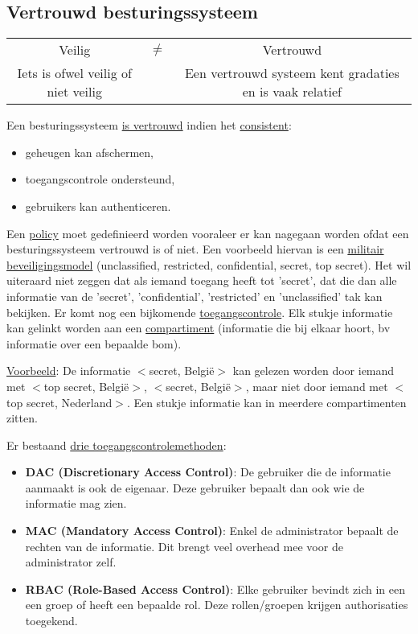 \documentclass{report}
\begin{document}
	\subsection{Vertrouwd besturingssysteem}

	\begin{table}[ht]
		\centering
		\begin{tabular}{c c c}
			Veilig & $\neq$  & Vertrouwd \\

			Iets is ofwel veilig of niet veilig & & Een vertrouwd systeem kent gradaties en is vaak relatief
		\end{tabular}
	\end{table}

	Een besturingssysteem \underline{is vertrouwd} indien het \underline{consistent}:
	\begin{itemize}
		\item geheugen kan afschermen,
		\item toegangscontrole ondersteund,
		\item gebruikers kan authenticeren.
	\end{itemize}

	Een \underline{policy} moet gedefinieerd worden vooraleer er kan nagegaan worden ofdat een besturingssysteem vertrouwd is of niet. Een voorbeeld hiervan is een \underline{militair beveiligingsmodel} (unclassified, restricted, confidential, secret, top secret). Het wil uiteraard niet zeggen dat als iemand toegang heeft tot 'secret', dat die dan alle informatie van de 'secret', 'confidential', 'restricted' en 'unclassified' tak kan bekijken. Er komt nog een bijkomende \underline{toegangscontrole}. Elk stukje informatie kan gelinkt worden aan een \underline{compartiment} (informatie die bij elkaar hoort, bv informatie over een bepaalde bom).
	
	\underline{Voorbeeld}: De informatie $<$secret, België$>$ kan gelezen worden door iemand met $<$top secret, België$>$, $<$secret, België$>$, maar niet door iemand met $<$top secret, Nederland$>$. Een stukje informatie kan in meerdere compartimenten zitten.

	Er bestaand \underline{drie toegangscontrolemethoden}:
	\begin{itemize}
		\item \textbf{DAC (Discretionary Access Control)}: De gebruiker die de informatie aanmaakt is ook de eigenaar. Deze gebruiker bepaalt dan ook wie de informatie mag zien. 
		\item \textbf{MAC (Mandatory Access Control)}: Enkel de administrator bepaalt de rechten van de informatie. Dit brengt veel overhead mee voor de administrator zelf.
		\item \textbf{RBAC (Role-Based Access Control)}: Elke gebruiker bevindt zich in een een groep of heeft een bepaalde rol. Deze rollen/groepen krijgen authorisaties toegekend. 
	\end{itemize}
\end{document}
